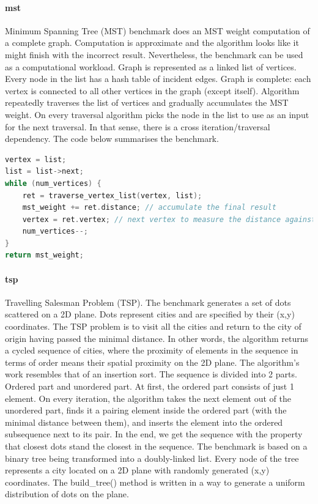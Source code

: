 \paragraph{mst} Minimum Spanning Tree (MST) benchmark does an MST weight computation of a complete graph. Computation is approximate and the algorithm looks like it might finish with the incorrect result. Nevertheless, the benchmark can be used as a computational workload. Graph is represented as a linked list of vertices. Every node in the list has a hash table of incident edges. Graph is complete: each vertex is connected to all other vertices in the graph (except itself). Algorithm repeatedly traverses the list of vertices and gradually accumulates the MST weight. On every traversal algorithm picks the node in the list to use as an input for the next traversal. In that sense, there is a cross iteration/traversal dependency. The code below summarises the benchmark.\newline\null
\begin{minipage}[t]{\linewidth}
\begin{lstlisting}[caption={The main algorithm of mst benchmark.},label={lst:mst_code},language=C]
vertex = list;
list = list->next;
while (num_vertices) {
    ret = traverse_vertex_list(vertex, list);
    mst_weight += ret.distance; // accumulate the final result
    vertex = ret.vertex; // next vertex to measure the distance against
    num_vertices--;
}
return mst_weight;
\end{lstlisting}
\end{minipage}
\paragraph{tsp} Travelling Salesman Problem (TSP). The benchmark generates a set of dots scattered on a 2D plane. Dots represent cities and are specified by their (x,y) coordinates. The TSP problem is to visit all the cities and return to the city of origin having passed the minimal distance. In other words, the algorithm returns a cycled sequence of cities, where the proximity of elements in the sequence in terms of order means their spatial proximity on the 2D plane. The algorithm’s work resembles that of an insertion sort. The sequence is divided into 2 parts. Ordered part and unordered part. At first, the ordered part consists of just 1 element. On every iteration, the algorithm takes the next element out of the unordered part, finds it a pairing element inside the ordered part (with the minimal distance between them), and inserts the element into the ordered subsequence next to its pair. In the end, we get the sequence with the property that closest dots stand the closest in the sequence. The benchmark is based on a binary tree being transformed into a doubly-linked list. Every node of the tree represents a city located on a 2D plane with randomly generated (x,y) coordinates. The build\_tree() method is written in a way to generate a uniform distribution of dots on the plane.

%

%